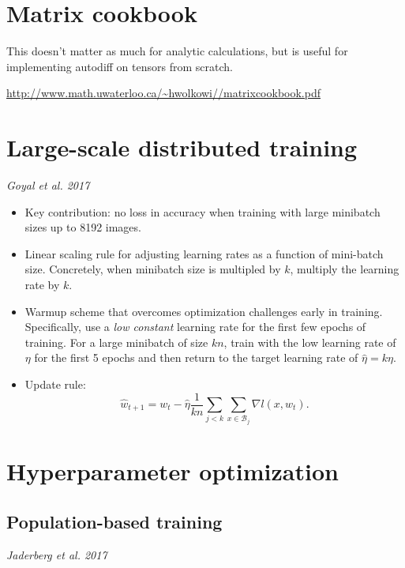 \section{Matrix cookbook}

This doesn't matter as much for analytic calculations, but is useful for implementing autodiff on tensors from scratch.

\url{http://www.math.uwaterloo.ca/~hwolkowi//matrixcookbook.pdf}


\section{Large-scale distributed training}

{\it Goyal et al. 2017}~\cite{goyal2017accurate}

\begin{itemize}
  \item Key contribution: no loss in accuracy when training with large minibatch sizes up to 8192 images.
  \item Linear scaling rule for adjusting learning rates as a function of mini-batch size.  Concretely, when minibatch size is multipled by $k$, multiply the learning rate by $k$.
  \item Warmup scheme that overcomes optimization challenges early in training.  Specifically, use a {\it low constant} learning rate for the first few epochs of training.  For a large minibatch of size $kn$, train with the low learning rate of $\eta$ for the first 5 epochs and then return to the target learning rate of $\hat{\eta} = k \eta$.
  \item Update rule:
    \[
      \hat{w}_{t+1} = w_t - \hat{\eta} \frac{1}{kn} \sum_{j < k} \sum_{x \in \mathcal{B}_j} \nabla l (x, w_t).
    \]
\end{itemize}

\section{Hyperparameter optimization}

\subsection{Population-based training}

{\it Jaderberg et al. 2017}~\cite{jaderberg2017population}

